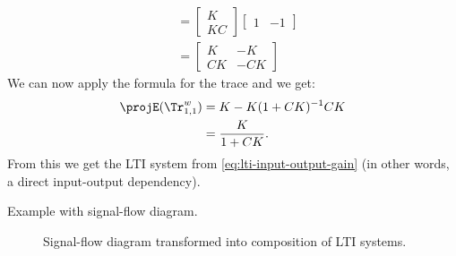 {\begin{example}
\begin{equation*}
\begin{aligned}
                        & =\begin{bmatrix}K \\ {KC}\end{bmatrix}\begin{bmatrix} 1 & -1 \end{bmatrix} \\
                        & =\begin{bmatrix}
                               K  & -K  \\
                               CK & -CK
                           \end{bmatrix}
            \end{aligned}
        \end{equation*}
        We can now apply the formula for the trace and we get:
        \begin{equation*}
            \begin{aligned}
                \projE(\Tr_{1,1}^{w}) & =K - K(1+CK)^{-1}CK \\
                                      & =\frac{K}{1+CK}.
            \end{aligned}
        \end{equation*}
        From this we get the LTI system from \cref{eq:lti-input-output-gain} (in other words, a direct input-output dependency).

        \begin{marginfigure}
            \begin{center}
            \end{center}
            \caption{Example with signal-flow diagram.}
            \label{fig:lti-ex-signalflow}
        \end{marginfigure}
    \end{example}

    \begin{figure}
        \centering
        \caption{Signal-flow diagram transformed into composition of LTI systems.}
        \label{fig:lti-ex-signalflow-bis}
    \end{figure}}
